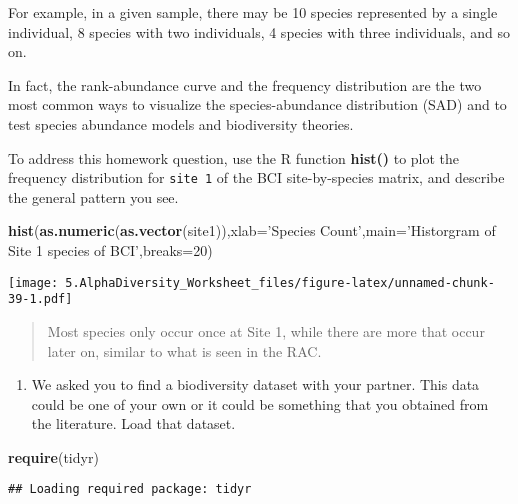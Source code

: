 \documentclass[
]{article}
\newenvironment{Shaded}{\begin{snugshade}}{\end{snugshade}}
\newcommand{\DataTypeTok}[1]{\textcolor[rgb]{0.13,0.29,0.53}{#1}}
\newcommand{\DecValTok}[1]{\textcolor[rgb]{0.00,0.00,0.81}{#1}}
\newcommand{\KeywordTok}[1]{\textcolor[rgb]{0.13,0.29,0.53}{\textbf{#1}}}
\newcommand{\NormalTok}[1]{#1}
\newcommand{\StringTok}[1]{\textcolor[rgb]{0.31,0.60,0.02}{#1}}
\providecommand{\tightlist}{%
  \setlength{\itemsep}{0pt}\setlength{\parskip}{0pt}}
\begin{document}
For example, in a given sample, there may be 10 species represented by a
single individual, 8 species with two individuals, 4 species with three
individuals, and so on.

In fact, the rank-abundance curve and the frequency distribution are the
two most common ways to visualize the species-abundance distribution
(SAD) and to test species abundance models and biodiversity theories.

To address this homework question, use the R function \textbf{hist()} to
plot the frequency distribution for \texttt{site\ 1} of the BCI
site-by-species matrix, and describe the general pattern you see.

\begin{Shaded}
\begin{Highlighting}[]
\KeywordTok{hist}\NormalTok{(}\KeywordTok{as.numeric}\NormalTok{(}\KeywordTok{as.vector}\NormalTok{(site1)),}\DataTypeTok{xlab=}\StringTok{'Species Count'}\NormalTok{,}\DataTypeTok{main=}\StringTok{'Historgram of Site 1 species of BCI'}\NormalTok{,}\DataTypeTok{breaks=}\DecValTok{20}\NormalTok{)}
\end{Highlighting}
\end{Shaded}

\texttt{[image: 5.AlphaDiversity\_Worksheet\_files/figure-latex/unnamed-chunk-39-1.pdf]}

\begin{quote}
Most species only occur once at Site 1, while there are more that occur
later on, similar to what is seen in the RAC.
\end{quote}

\begin{enumerate}
\def\labelenumi{\arabic{enumi}.}
\setcounter{enumi}{2}
\tightlist
\item
  We asked you to find a biodiversity dataset with your partner. This
  data could be one of your own or it could be something that you
  obtained from the literature. Load that dataset.
\end{enumerate}

\begin{Shaded}
\begin{Highlighting}[]
\KeywordTok{require}\NormalTok{(tidyr)}
\end{Highlighting}
\end{Shaded}

\begin{verbatim}
## Loading required package: tidyr
\end{verbatim}
\end{document}
